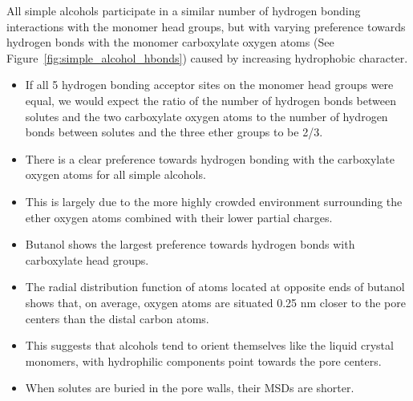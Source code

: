 \documentclass{article}
\begin{document}
  All simple alcohols participate in a similar number of hydrogen bonding interactions
  with the monomer head groups, but with varying preference towards hydrogen bonds with
  the monomer carboxylate oxygen atoms (See Figure~\ref{fig:simple_alcohol_hbonds}) caused
  by increasing hydrophobic character.
  \begin{itemize}
  	\item If all 5 hydrogen bonding acceptor sites on the monomer head groups were equal,
  	we would expect the ratio of the number of hydrogen bonds between solutes and the two 
  	carboxylate oxygen atoms to the number of hydrogen bonds between solutes and the three
  	ether groups to be 2/3. 
  	\item There is a clear preference towards hydrogen bonding with the carboxylate 
  	oxygen atoms for all simple alcohols.
  	\item This is largely due to the more highly crowded environment surrounding the ether
  	oxygen atoms combined with their lower partial charges.
  	\item Butanol shows the largest preference towards hydrogen bonds with carboxylate 
  	head groups.
  	\item The radial distribution function of atoms located at opposite ends of butanol
  	shows that, on average, oxygen atoms are situated 0.25 nm closer to the pore centers
  	than the distal carbon atoms.
  	\item This suggests that alcohols tend to orient themselves like the liquid crystal 
  	monomers, with hydrophilic components point towards the pore centers.
  	\item When solutes are buried in the pore walls, their MSDs are shorter.
  \end{itemize}
  
\end{document}
